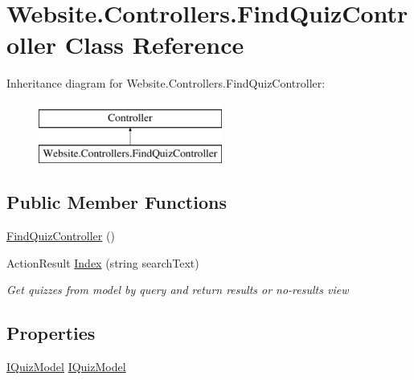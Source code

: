 \hypertarget{class_website_1_1_controllers_1_1_find_quiz_controller}{}\section{Website.\+Controllers.\+Find\+Quiz\+Controller Class Reference}
\label{class_website_1_1_controllers_1_1_find_quiz_controller}
Inheritance diagram for Website.\+Controllers.\+Find\+Quiz\+Controller\+:\begin{figure}[H]
\begin{center}
\leavevmode
\includegraphics[height=2.000000cm]{class_website_1_1_controllers_1_1_find_quiz_controller}
\end{center}
\end{figure}
\subsection*{Public Member Functions}
\begin{DoxyCompactItemize}
\item 
\hyperlink{class_website_1_1_controllers_1_1_find_quiz_controller_a0626d88cfe1b428c0e8362e23f2611a8}{Find\+Quiz\+Controller} ()
\item 
Action\+Result \hyperlink{class_website_1_1_controllers_1_1_find_quiz_controller_a95966c9c8f1e27eaa7bb58236a49f765}{Index} (string search\+Text)
\begin{DoxyCompactList}\small\item\em Get quizzes from model by query and return results or no-\/results view \end{DoxyCompactList}\end{DoxyCompactItemize}
\subsection*{Properties}
\begin{DoxyCompactItemize}
\item 
\hyperlink{interface_website_1_1_controllers_1_1_i_quiz_model}{I\+Quiz\+Model} \hyperlink{class_website_1_1_controllers_1_1_find_quiz_controller_a900cc3a2c724ee91d70c158cb25cae71}{I\+Quiz\+Model}
\end{DoxyCompactItemize}


